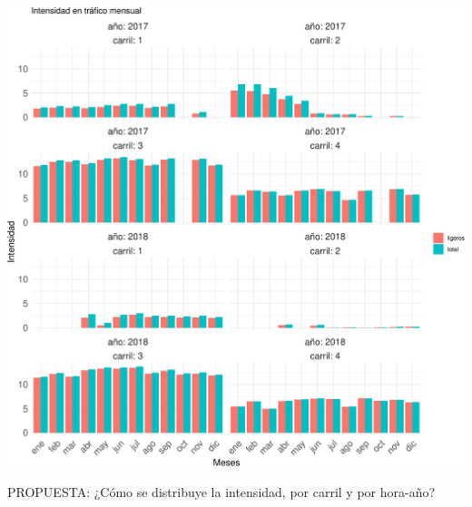 \documentclass[]{article}
\begin{document}
\begin{center}\includegraphics{./figure/unnamed-chunk-7-1} \end{center}

PROPUESTA: ¿Cómo se distribuye la intensidad, por carril y por hora-año?
\end{document}
